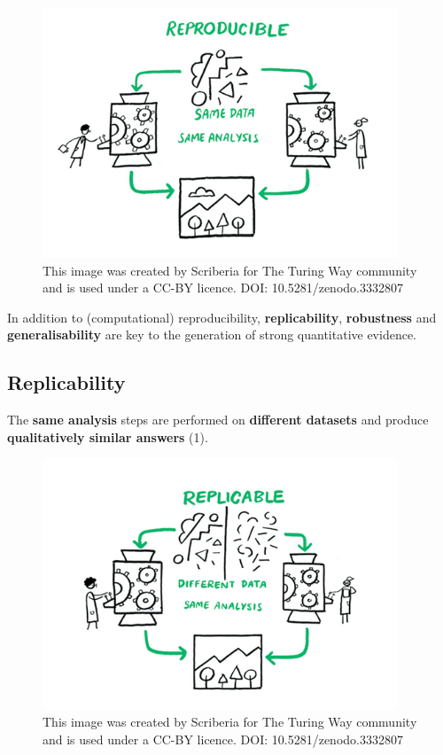 \documentclass[
  letterpaper,
  DIV=11,
  numbers=noendperiod,
  oneside]{scrreprt}
\begin{document}
\begin{figure}

{\centering \includegraphics[width=4.16667in,height=\textheight]{images/paste-97E0048A.png}

}

\caption{\label{fig-reproducibility}This image was created by Scriberia
for The Turing Way community and is used under a CC-BY licence. DOI:
10.5281/zenodo.3332807}

\end{figure}

In addition to (computational) reproducibility, \textbf{replicability},
\textbf{robustness} and \textbf{generalisability} are key to the
generation of strong quantitative evidence.

\subsection{Replicability}

The \textbf{same analysis} steps are performed on \textbf{different
datasets} and produce \textbf{qualitatively similar answers} (1).

\begin{figure}

{\centering \includegraphics[width=4.16667in,height=\textheight]{images/paste-5D367441.png}

}

\caption{\label{fig-replicability}This image was created by Scriberia
for The Turing Way community and is used under a CC-BY licence. DOI:
10.5281/zenodo.3332807}

\end{figure}
\end{document}
